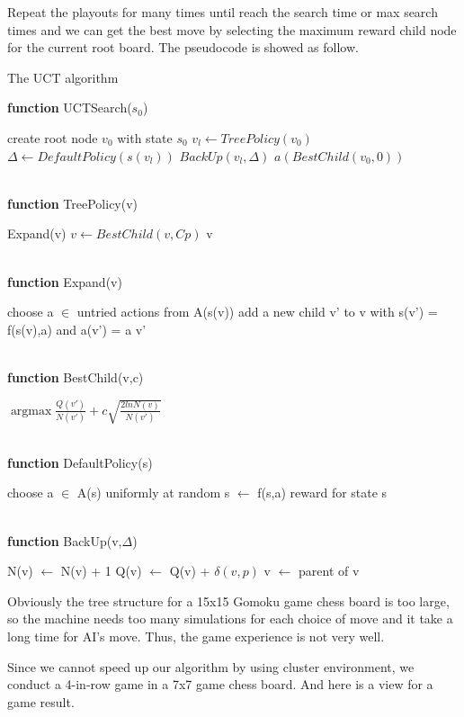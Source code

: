 \documentclass[12pt,a4paper]{article}
\begin{document}
\par Repeat the playouts for many times until reach the search time or max search times and we can get the best move by selecting the maximum reward child node for the current root board. The pseudocode is showed as follow.
\begin{algorithm}[H]
\caption{The UCT algorithm}
\hspace*{0.02in} {\bf function}
UCTSearch($s_0$)
\begin{algorithmic}
\State create root node $v_0$ with state $s_0$
	\State $v_l \gets TreePolicy(v_0)$
	\State $\Delta \gets DefaultPolicy(s(v_l))$
	\State $BackUp(v_l, \Delta)$
\EndWhile
\State \Return $a(BestChild(v_0, 0))$
\end{algorithmic}
~\\
\hspace*{0.02in} {\bf function}
TreePolicy(v)
\begin{algorithmic}
		\State \Return Expand(v)
	\Else
		\State $v \gets BestChild(v, Cp)$
	\EndIf
\EndWhile
\State \Return v
\end{algorithmic}
~\\
\hspace*{0.02in} {\bf function}
Expand(v)
\begin{algorithmic}
\State choose a $\in$ untried actions from A(s(v))
\State add a new child v' to v with s(v') = f(s(v),a) and a(v') = a
\State \Return v'
\end{algorithmic}
~\\
\hspace*{0.02in} {\bf function}
BestChild(v,c)
\begin{algorithmic}
\State \Return $\mathop{\arg\max} \frac{Q(v')}{N(v')} + c\sqrt{\frac{2lnN(v)}{N(v')}}$
\end{algorithmic}
~\\
\hspace*{0.02in} {\bf function}
DefaultPolicy(s)
\begin{algorithmic}
	\State choose a $\in$ A(s) uniformly at random
	\State s $\gets$ f(s,a)
\EndWhile
\State \Return reward for state s
\end{algorithmic}
~\\
\hspace*{0.02in} {\bf function}
BackUp(v,$\Delta$)
\begin{algorithmic}
	\State N(v) $\gets$ N(v) + 1
	\State Q(v) $\gets$ Q(v) + $\delta(v, p)$
	\State v $\gets$ parent of v
\EndWhile
\end{algorithmic}
\end{algorithm}
\par Obviously the tree structure for a 15x15 Gomoku game chess board is too large, so the machine needs too many simulations for each choice of move and it take a long time for AI's move. Thus, the game experience is not very well.
\par Since we cannot speed up our algorithm by using cluster environment, we conduct a 4-in-row game in a 7x7 game chess board. And here is a view for a game result.
\end{document}
